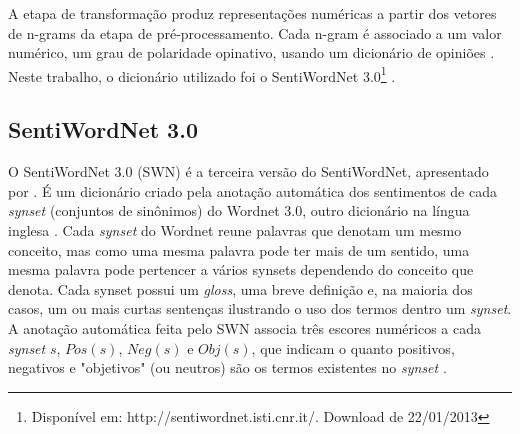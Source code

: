 \documentclass[template.tex]{subfiles}
\begin{document}
A etapa de transformação produz representações numéricas a partir dos vetores de n-grams da etapa de pré-processamento. Cada n-gram é associado a um valor numérico, um grau de polaridade opinativo, usando um dicionário de opiniões \cite{ballhysa2012fuzzy, moraes2012document, mouthami2013sentiment}. Neste trabalho, o dicionário utilizado foi o SentiWordNet 3.0\footnote{Disponível em: http://sentiwordnet.isti.cnr.it/. Download de 22/01/2013} \cite{baccianella2010sentiwordnet}.

\subsection{SentiWordNet 3.0}

O SentiWordNet 3.0 (SWN) é a terceira versão do SentiWordNet, apresentado por \cite{esuli2006sentiwordnet}. É um dicionário criado pela anotação automática dos sentimentos de cada \textit{synset} (conjuntos de sinônimos) do Wordnet 3.0, outro dicionário na língua inglesa \cite{fellbaum2005wordnet}. Cada \textit{synset} do Wordnet reune palavras que denotam um mesmo conceito, mas como uma mesma palavra pode ter mais de um sentido, uma mesma palavra pode pertencer a vários synsets dependendo do conceito que denota. Cada synset possui um \textit{gloss}, uma breve definição e, na maioria dos casos, um ou mais curtas sentenças ilustrando o uso dos termos dentro um \textit{synset}. A anotação automática feita pelo SWN associa três escores numéricos a cada \textit{synset} $s$, $Pos(s)$, $Neg(s)$ e $Obj(s)$, que indicam o quanto positivos, negativos e "objetivos" (ou neutros) são os termos existentes no \textit{synset} \cite{baccianella2010sentiwordnet}. 

\end{document}
